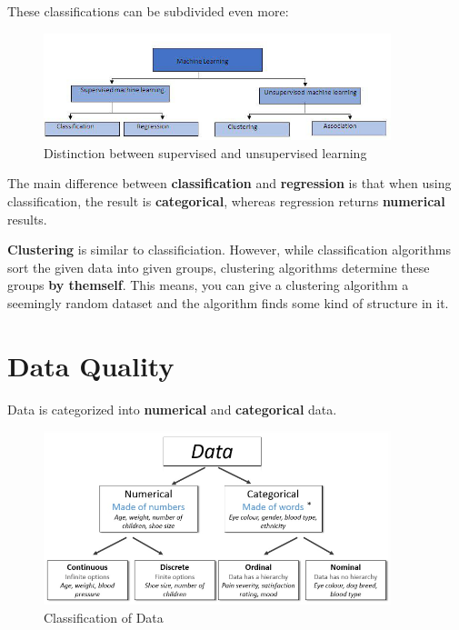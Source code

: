 \documentclass[a4paper, 11pt]{article}
\begin{document}
These classifications can be subdivided even more:

\begin{figure}[htb!]
    \centering
    \includegraphics[keepaspectratio=true, width=0.9\textwidth]{disciplines.jpg}
    \caption{Distinction between supervised and unsupervised learning}
    \label{fig:class}
\end{figure}

The main difference between \textbf{classification} and \textbf{regression} is that when using classification, the result is \textbf{categorical}, whereas regression returns \textbf{numerical} results. 

\textbf{Clustering} is similar to classificiation. However, while classification algorithms sort the given data into given groups, clustering algorithms determine these groups \textbf{by themself}. This means, you can give a clustering algorithm a seemingly random dataset and the algorithm finds some kind of structure in it.

\newpage

\section{Data Quality}

Data is categorized into \textbf{numerical} and \textbf{categorical} data. 

\begin{figure}[htb!]
    \centering
    \includegraphics[keepaspectratio=true, width=0.9\textwidth]{data_classification.png}
    \caption{Classification of Data}
    \label{fig:data_classification}
\end{figure}
\end{document}
